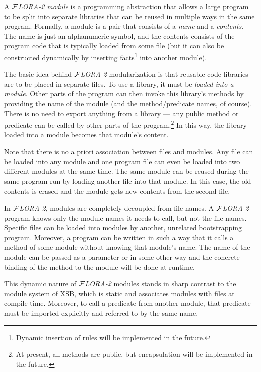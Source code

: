 \documentclass[11pt]{article}
\newcommand{\FLORA}{{\mbox{${\cal F}${\small\it LORA}\rm\emph{-2}}}\xspace}
\begin{document}
A \emph{\FLORA module} is a programming abstraction that allows a large
program to be split into separate libraries that can be reused in multiple
ways in the same program. Formally, a module is a pair that consists of a
\emph{name} and a \emph{contents}. The name is just an alphanumeric symbol,
and the contents consists of the program code that is typically loaded from
some file (but it can also be constructed dynamically by inserting
facts\footnote{
  Dynamic insertion of rules will be implemented in the future.
  }
into another module).

The basic idea behind \FLORA modularization is that reusable code libraries
are to be placed in separate files.  To use a library, it must be
\emph{loaded into a module}. Other parts of the program can then invoke
this library's methods by providing the name of the module (and the
method/predicate names, of course).  There is no need to export anything
from a library --- any public method or predicate can be called by other
parts of the program.\footnote{
  At present, all methods are public, but encapsulation will be implemented
  in the future.
  }
In this way, the library loaded into a module becomes that module's content.

Note that there is no a priori association between files and modules.  Any
file can be loaded into any module and one program file can even be loaded
into two different modules at the same time. The same module can be reused
during the same program run by loading another file into that module. In
this case, the old contents is erased and the module gets new contents from
the second file.

In \FLORA, modules are completely decoupled from file
names. A \FLORA program knows only the module names it needs to call, but
not the file names. Specific files can be loaded into modules by another,
unrelated bootstrapping program. Moreover, a program can be written in such
a way that it calls a method of some module without knowing that module's
name. The name of the module can be passed as a parameter or in some other
way and the concrete binding of the method to the module will be done at
runtime.

This dynamic nature of \FLORA modules stands in sharp contrast to the module
system of XSB, which is static and associates modules with files at compile
time. Moreover, to call a predicate from another module, that predicate
must be imported explicitly and referred to by the same name.
\end{document}
